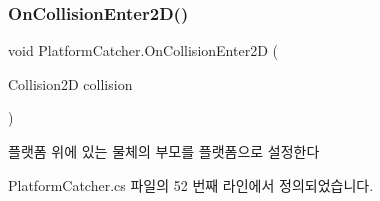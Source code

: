 \subsubsection{\texorpdfstring{OnCollisionEnter2D()}{OnCollisionEnter2D()}}
{\footnotesize\ttfamily void Platform\+Catcher.\+On\+Collision\+Enter2D (\begin{DoxyParamCaption}\item[{Collision2D}]{collision }\end{DoxyParamCaption})\hspace{0.3cm}{\ttfamily [private]}}



플랫폼 위에 있는 물체의 부모를 플랫폼으로 설정한다 



Platform\+Catcher.\+cs 파일의 52 번째 라인에서 정의되었습니다.


